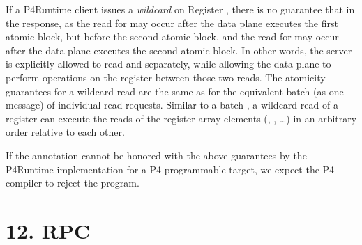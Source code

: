 \documentclass[11pt]{article}
\begin{document}
{%
\noindent{}If a P4Runtime client issues a \emph{wildcard}  on Register , there is no
guarantee that  in the response, as the read for  may
occur after the data plane executes the first atomic block, but before the
second atomic block, and the read for  may occur after the data plane
executes the second atomic block. In other words, the server is explicitly
allowed to read  and  separately, while allowing the data plane to
perform operations on the register between those two reads. The atomicity
guarantees for a wildcard read are the same as for the equivalent batch (as one
 message) of individual read requests. Similar to a batch
, a wildcard read of a register can execute the reads of the
register array elements (, , \dots{}) in an arbitrary order relative
to each other.%

If the  annotation cannot be honored with the above guarantees by the
P4Runtime implementation for a P4-programmable target, we expect the P4 compiler
to reject the program.%

\section{12.\hspace*{0.5em} RPC}\label{sec-write-rpc}%

}
\end{document}
